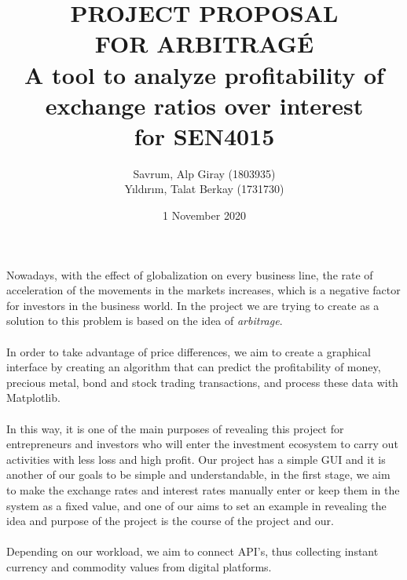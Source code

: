 \documentclass{article}
\title{
	\huge{PROJECT PROPOSAL \\ FOR ARBITRAGÉ\\[1cm]}
    \large A tool to analyze profitability of\\
    exchange ratios over interest\\[0.5cm]
	for SEN4015
}
\author {
	Savrum, Alp Giray (1803935) \\
	Yıldırım, Talat Berkay (1731730) \\
}
\date{1 November 2020}
\begin{document}
\maketitle

\section*{}
Nowadays, with the effect of globalization on every
business line, the rate of acceleration of the movements
in the markets increases, which is a negative factor for
investors in the business world. In the project we are
trying to create as a solution to this problem is based
on the idea of \textit{arbitrage}.\\\\In order to take advantage of
price differences, we aim to create a graphical interface
by creating an algorithm that can predict the profitability
of money, precious metal, bond and stock trading transactions,
and process these data with Matplotlib.\\\\In this way, it is
one of the main purposes of revealing this project for
entrepreneurs and investors who will enter the investment
ecosystem to carry out activities with less loss and high
profit. Our project has a simple GUI and it is another of
our goals to be simple and understandable, in the first
stage, we aim to make the exchange rates and interest
rates manually enter or keep them in the system as a
fixed value, and one of our aims to set an example in
revealing the idea and purpose of the project is the
course of the project and our.\\\\Depending on our workload,
we aim to connect API's, thus collecting instant currency
and commodity values from digital platforms. 

\begin{figure}[h!]
\centering
\label{fig:universe}
\end{figure}




\end{document}
